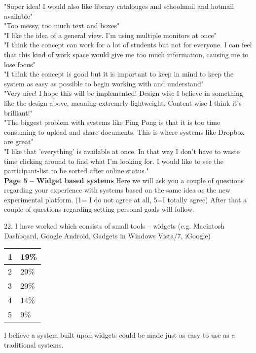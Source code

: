 	"Super idea! I would also like library catalouges and schoolmail and hotmail available" \\
	"Too messy, too much text and boxes" \\
	"I like the idea of a general view. I'm using multiple monitors at once" \\
	"I think the concept can work for a lot of students but not for everyone. I can feel that this kind of work space would give me too much information, causing me to lose focus" \\
	"I think the concept is good but it is important to keep in mind to keep the system as easy as possible to begin working with and understand" \\
	"Very nice! I hope this will be implemented! Design wise I believe in something like the design above, meaning extremely lightweight. Content wise I think it's brilliant!" \\
	"The biggest problem with systems like Ping Pong is that it is too time consuming to upload and share documents. This is where systems like Dropbox are great" \\
	"I like that 'everything' is available at once. In that way I don't have to waste time clicking around to find what I'm looking for. I would like to see the participant-list to be sorted after online status." \\

\textbf {Page 5 – Widget based systems}
Here we will ask you a couple of questions regarding your experience with systems  based on the same idea as the new experimental platform. (1= I do not agree at all, 5=I totally agree) After that a couple of questions regarding setting personal goals will follow.

22. I have worked which consists of small tools – widgets (e.g. Macintosh Dashboard, Google Android, Gadgets in Windows Vista/7, iGoogle)

\begin{center}
    \begin{tabular}{ | l | l | }
    \hline
    1 & 19\% \\ \hline
	2 & 29\% \\ \hline
	3 & 29\% \\ \hline
	4 & 14\% \\ \hline
	5 & 9\% \\ \hline
    \end{tabular}
\end{center}

I believe a system built upon widgets could be made just as easy to use as a traditional systems.

